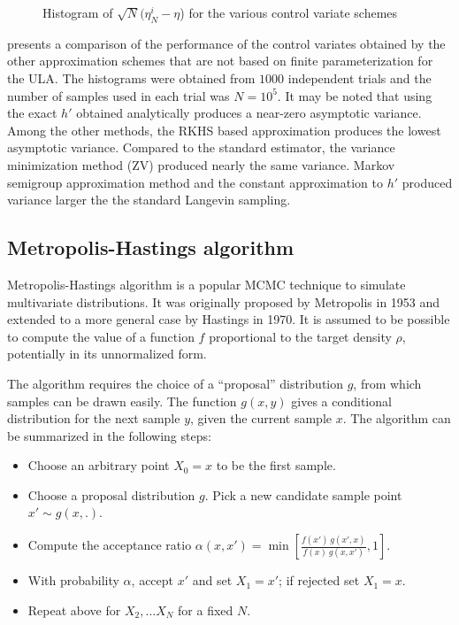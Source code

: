 \begin{figure}[h]
	\begin{center}
		\caption{Histogram of $\sqrt{N}(\eta_N^{i} - \eta$) for the various control variate schemes}
		\label{hist_all}
	\end{center}
\end{figure}

 presents a comparison of the performance of the control variates obtained by the other approximation schemes that are not based on finite parameterization for the ULA. The histograms were obtained from $1000$ independent trials and the number of samples used in each trial was $N=10^5$. It may be noted that using the exact $h'$ obtained analytically produces a near-zero asymptotic variance. Among the other methods, the RKHS based approximation produces the lowest asymptotic variance. Compared to the standard estimator, the variance minimization method (ZV) \cite{papmirgir} produced nearly the same variance. Markov semigroup approximation method \cite{tagmeh16a} and the constant approximation to $h'$ produced variance larger the the standard Langevin sampling.


\subsection*{Metropolis-Hastings algorithm}
\label{s:mh}

Metropolis-Hastings algorithm is a popular MCMC technique to simulate multivariate distributions. It was originally proposed by Metropolis in 1953 and extended to a more general case by Hastings in 1970. It is assumed to be possible to compute the value of a function $f$ proportional to the target density $\rho$, potentially in its unnormalized form.

The algorithm requires the choice of a ``proposal'' distribution $g$, from which samples can be drawn easily. The function $g(x,y)$ gives a conditional distribution for the next sample $y$, given the current sample $x$.  The algorithm can be summarized in the following steps:

\begin{itemize}
	\item Choose an arbitrary point $X_0 = x$ to be the first sample.
	\item Choose a proposal distribution $g$. Pick a new candidate sample point $x' \sim g (x,.) $.
	\item Compute the acceptance ratio $\alpha(x,x')= \min \left[ \frac{f(x') \, g (x',x)}{f(x) \, g(x,x')}, 1\right] $.
	\item With probability $\alpha$, accept $x'$ and set $X_1 = x'$; if rejected set $X_1 = x$.
	\item Repeat above for $ X_2, \hdots X_N$ for a fixed $N$.
\end{itemize}

